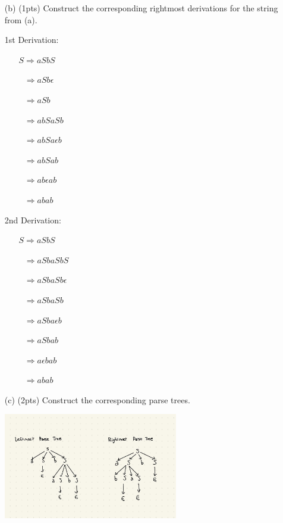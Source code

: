 \documentclass[11pt]{amsart}
\begin{document}
\begin{enumerate}
\vspace{0.25cm}

\item[(b)] (1pts) Construct the corresponding rightmost derivations for the string from (a).

\vspace{0.25cm}

1st Derivation:

\vspace{0.25cm}

\begin{enumerate}
	\item [] $S \Rightarrow aSbS$
	\item [] $\ \ \ \Rightarrow aSb\epsilon$
	\item [] $\ \ \ \Rightarrow aSb$
	\item [] $\ \ \ \Rightarrow abSaSb$
	\item [] $\ \ \ \Rightarrow abSa\epsilon b$
	\item [] $\ \ \ \Rightarrow abSab$
	\item [] $\ \ \ \Rightarrow ab\epsilon ab$
	\item [] $\ \ \ \Rightarrow abab$
\end{enumerate}

\newpage
2nd Derivation:

\vspace{0.25cm}

\begin{enumerate}
	\item [] $S \Rightarrow aSbS$
	\item [] $\ \ \ \Rightarrow aSbaSbS$
	\item [] $\ \ \ \Rightarrow aSbaSb\epsilon $
	\item [] $\ \ \ \Rightarrow aSbaSb$
	\item [] $\ \ \ \Rightarrow aSba\epsilon b$
	\item [] $\ \ \ \Rightarrow aSbab$
	\item [] $\ \ \ \Rightarrow a\epsilon bab$
	\item [] $\ \ \ \Rightarrow abab$
\end{enumerate}

\vspace{0.25cm}

\item[(c)] (2pts) Construct the corresponding parse trees.

\begin{center}
	\includegraphics[width=0.6\textwidth]{IMG_0078.jpg}
\end{center}


\end{enumerate}
\end{document}
